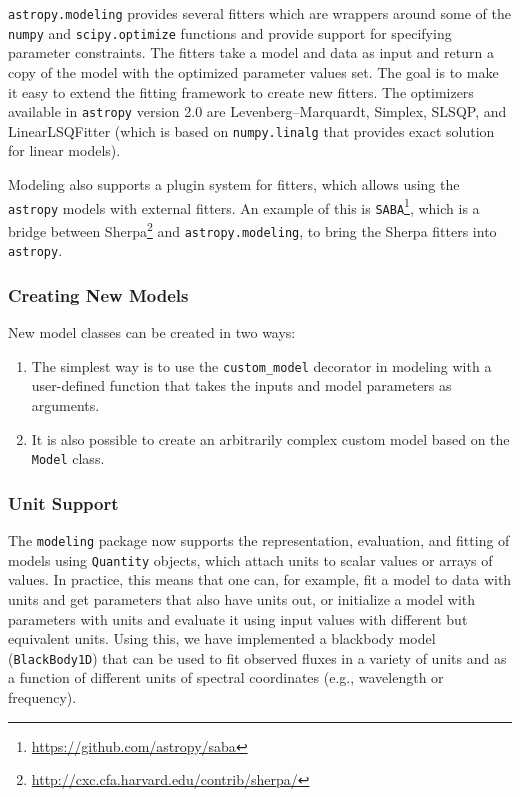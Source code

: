 \documentclass[modern]{aastex61}
\newcommand{\package}[1]{\texttt{#1}\xspace}
\newcommand{\astropypkg}{\package{astropy}}
\newcommand{\inlinecomment}[2]{\todo[inline]{#1: #2}\xspace}
\begin{document}
\package{astropy.modeling} provides several fitters which are wrappers around some of the \texttt{numpy} and \texttt{scipy.optimize} functions and provide support for specifying parameter constraints. The fitters take a model and data as input and return a copy of the model with the optimized parameter values set. The goal is to make it easy to extend the fitting framework to create new fitters. The optimizers available in \astropypkg version 2.0 are Levenberg--Marquardt, Simplex, SLSQP, and LinearLSQFitter (which is based on \texttt{numpy.linalg} that provides exact solution for linear models).


Modeling also supports a plugin system for fitters, which allows using the
\astropypkg models with external fitters. An example of this is
\package{SABA}\footnote{\url{https://github.com/astropy/saba}}, which is a bridge between
Sherpa\footnote{\url{http://cxc.cfa.harvard.edu/contrib/sherpa/}}
and \package{astropy.modeling}, to bring the Sherpa fitters into \astropypkg.

\subsubsection{Creating New Models}

New model classes can be created in two ways:
\begin{enumerate}
   \item The simplest way is to use the \texttt{custom\_model} decorator in modeling with a user-defined function that takes the inputs and model parameters as arguments.
   \item It is also possible to create an arbitrarily complex custom model based on the \texttt{Model} class.
\end{enumerate}

\subsubsection{Unit Support}

The \package{modeling} package now supports the representation, evaluation, and fitting of models using \texttt{Quantity} objects, which attach units to scalar values or arrays of values. In practice, this means that one can, for example, fit a model to data with units and get parameters that also have units out, or initialize a model with parameters with units and evaluate it using input values with different but equivalent units. Using this, we have implemented a blackbody model (\texttt{BlackBody1D}) that can be used to fit observed fluxes in a variety of units and as a function of different units of spectral coordinates (e.g., wavelength or frequency).
\end{document}
